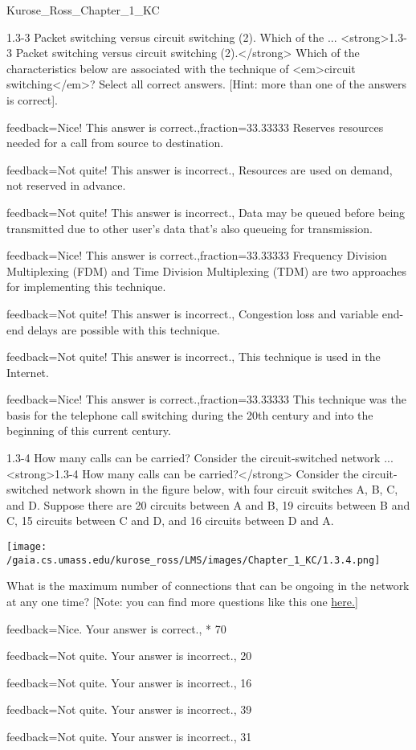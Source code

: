 \documentclass[a4paper]{article}
\begin{document}
\begin{quiz}{Kurose_Ross_Chapter_1_KC}
\begin{multi}[
	points=1,
	penalty=0.33333,
	multiple,
]{1.3-3 Packet switching versus circuit switching (2).  Which of the ...}
<strong>1.3-3 Packet switching versus circuit switching (2).</strong>  Which of the characteristics below are associated with the technique of <em>circuit switching</em>? Select all correct answers. [Hint: more than one of the answers is correct].
\item[feedback={Nice! This answer is correct.},fraction=33.33333] Reserves resources needed for a call from source to destination.
\item[feedback={Not quite! This answer is incorrect.},] Resources are used on demand, not reserved in advance.
\item[feedback={Not quite! This answer is incorrect.},] Data may be queued before being transmitted due to other user’s data that’s also queueing for transmission.
\item[feedback={Nice! This answer is correct.},fraction=33.33333] Frequency Division Multiplexing (FDM) and Time Division Multiplexing (TDM) are two approaches for implementing this technique.
\item[feedback={Not quite! This answer is incorrect.},] Congestion loss and variable end-end delays are possible with this technique.
\item[feedback={Not quite! This answer is incorrect.},] This technique is used in the Internet.
\item[feedback={Nice! This answer is correct.},fraction=33.33333] This technique was the basis for the telephone call switching during the 20th century and into the beginning of this current century.
\end{multi}

\begin{multi}[
	points=1,
	penalty=0.33333,
]{1.3-4 How many calls can be carried? Consider the circuit-switched network ...}
<strong>1.3-4 How many calls can be carried?</strong> Consider the circuit-switched network shown in the figure below, with  four circuit switches A, B, C, and D. Suppose there are 20 circuits between A and B, 19 circuits between B and C, 15 circuits between C and D, and 16 circuits between D and A. 
\begin{center}
\texttt{[image: /gaia.cs.umass.edu/kurose\_ross/LMS/images/Chapter\_1\_KC/1.3.4.png]}
\end{center}
 What is the maximum number of connections that can be ongoing in the network at any one time? [Note: you can find more questions like this one \href{http://gaia.cs.umass.edu/kurose_ross/interactive/circuit_switching.php}{here.]}
\item[feedback={Nice. Your answer is correct.},]* 70
\item[feedback={Not quite. Your answer is incorrect.},] 20
\item[feedback={Not quite. Your answer is incorrect.},] 16
\item[feedback={Not quite. Your answer is incorrect.},] 39
\item[feedback={Not quite. Your answer is incorrect.},] 31
\end{multi}


\end{quiz}
\end{document}
